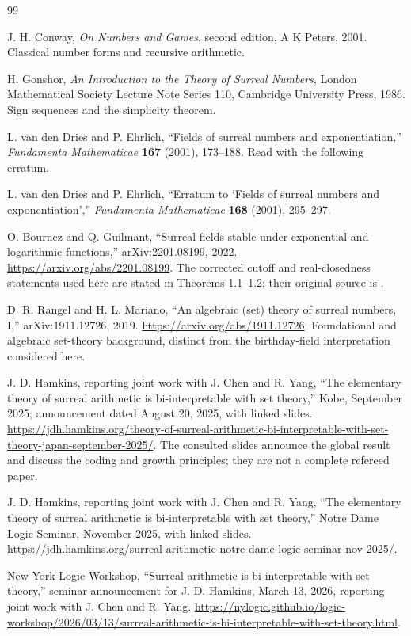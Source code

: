 \documentclass[11pt,letterpaper]{article}
\theoremstyle{definition}
\theoremstyle{remark}
\begin{document}
\begin{thebibliography}{99}

J. H. Conway, \emph{On Numbers and Games}, second edition,
A K Peters, 2001. Classical number forms and recursive arithmetic.

H. Gonshor, \emph{An Introduction to the Theory of Surreal Numbers},
London Mathematical Society Lecture Note Series 110,
Cambridge University Press, 1986. Sign sequences and the simplicity theorem.

L. van den Dries and P. Ehrlich, ``Fields of surreal numbers and
exponentiation,'' \emph{Fundamenta Mathematicae} \textbf{167} (2001),
173--188. Read with the following erratum.

L. van den Dries and P. Ehrlich, ``Erratum to `Fields of surreal numbers and
exponentiation','' \emph{Fundamenta Mathematicae} \textbf{168} (2001),
295--297.

O. Bournez and Q. Guilmant, ``Surreal fields stable under exponential and
logarithmic functions,'' arXiv:2201.08199, 2022.
\url{https://arxiv.org/abs/2201.08199}.
The corrected cutoff and real-closedness statements used here are stated
in Theorems 1.1--1.2; their original source is \cite{vdDE,vdDEerr}.

D. R. Rangel and H. L. Mariano, ``An algebraic (set) theory of surreal
numbers, I,'' arXiv:1911.12726, 2019.
\url{https://arxiv.org/abs/1911.12726}.
Foundational and algebraic set-theory background, distinct from the
birthday-field interpretation considered here.

J. D. Hamkins, reporting joint work with J. Chen and R. Yang,
``The elementary theory of surreal arithmetic is bi-interpretable with set
theory,'' Kobe, September 2025; announcement dated August 20, 2025,
with linked slides.
\url{https://jdh.hamkins.org/theory-of-surreal-arithmetic-bi-interpretable-with-set-theory-japan-september-2025/}.
The consulted slides announce the global result and discuss the coding and
growth principles; they are not a complete refereed paper.

J. D. Hamkins, reporting joint work with J. Chen and R. Yang,
``The elementary theory of surreal arithmetic is bi-interpretable with set
theory,'' Notre Dame Logic Seminar, November 2025, with linked slides.
\url{https://jdh.hamkins.org/surreal-arithmetic-notre-dame-logic-seminar-nov-2025/}.

New York Logic Workshop, ``Surreal arithmetic is bi-interpretable with set
theory,'' seminar announcement for J. D. Hamkins, March 13, 2026,
reporting joint work with J. Chen and R. Yang.
\url{https://nylogic.github.io/logic-workshop/2026/03/13/surreal-arithmetic-is-bi-interpretable-with-set-theory.html}.


\end{thebibliography}
\end{document}
